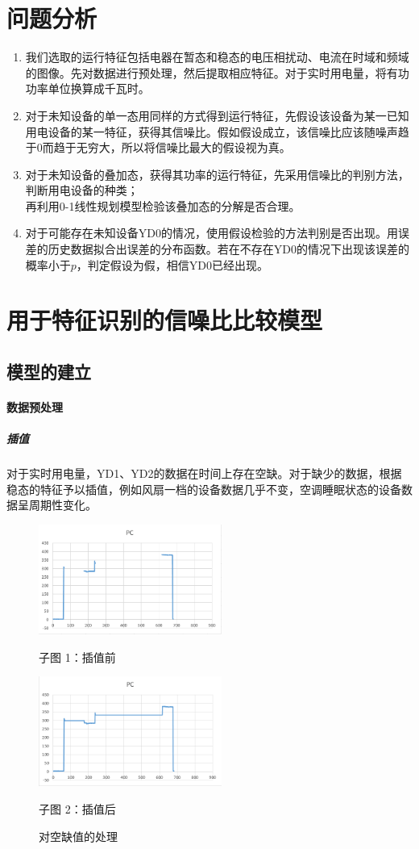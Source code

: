 \documentclass[UTF8]{article}
\begin{document}
\section{问题分析}
\begin{enumerate}[1]
\item 我们选取的运行特征包括电器在暂态和稳态的电压相扰动、电流在时域和频域的图像。先对数据进行预处理，然后提取相应特征。对于实时用电量，将有功功率单位换算成千瓦时。
\item 对于未知设备的单一态用同样的方式得到运行特征，先假设该设备为某一已知用电设备的某一特征，获得其信噪比。假如假设成立，该信噪比应该随噪声趋于0而趋于无穷大，所以将信噪比最大的假设视为真。
\item 对于未知设备的叠加态，获得其功率的运行特征，先采用信噪比的判别方法，判断用电设备的种类；\\
再利用0-1线性规划模型检验该叠加态的分解是否合理。
\item 对于可能存在未知设备YD0的情况，使用假设检验的方法判别是否出现。用误差的历史数据拟合出误差的分布函数。若在不存在YD0的情况下出现该误差的概率小于\(p\)，判定假设为假，相信YD0已经出现。
\end{enumerate}

\section{用于特征识别的信噪比比较模型}
\subsection{模型的建立}
\paragraph{数据预处理}
\subparagraph{插值}
\indent 对于实时用电量，YD1、YD2的数据在时间上存在空缺。对于缺少的数据，根据稳态的特征予以插值，例如风扇一档的设备数据几乎不变，空调睡眠状态的设备数据呈周期性变化。
\begin{figure}[htbp]
\centering
\begin{minipage}[htbp]{7cm}
\centering
\includegraphics[width=6cm]{i1.png}
\caption*{子图 1：插值前}
\end{minipage}
\begin{minipage}[htbp]{7cm}
\centering
\includegraphics[width=6cm]{i2.png}
\caption*{子图 2：插值后}
\end{minipage}
\caption{对空缺值的处理}
\end{figure}
\end{document}
